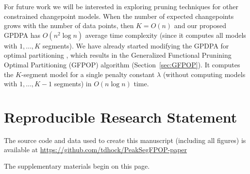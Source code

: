 \documentclass{article}
\begin{document}
For future work we will be interested in exploring pruning techniques
for other constrained changepoint models. When the number of expected
changepoints grows with the number of data points, then $K=O(n)$ and
our proposed GPDPA has $O(n^2 \log n)$ average time complexity (since
it computes all models with $1,\dots,K$ segments). We have already
started modifying the GPDPA for optimal partitioning
\citep{optimal-partitioning}, which results in the Generalized
Functional Prunining Optimal Partitioning (GFPOP) algorithm
(Section~\ref{sec:GFPOP}). It computes the $K$-segment model for a
single penalty constant $\lambda$ (without computing models with
$1,\dots,K-1$ segments) in $O(n\log n)$ time.

\section{Reproducible Research Statement}

The source code and data used to create this manuscript (including all
figures) is available at
\url{https://github.com/tdhock/PeakSegFPOP-paper}

\newpage

\appendix
The supplementary materials begin on this page.
\end{document}
